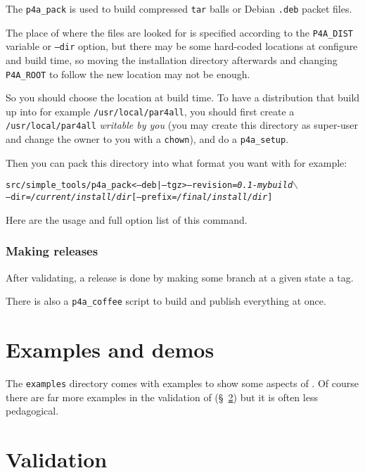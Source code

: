 \documentclass[a4paper]{article}
\begin{document}
The \verb|p4a_pack| is used to build compressed \texttt{tar} balls or Debian
\texttt{.deb} packet files.

The place of where the \Apfa files are looked for is specified according
to the \verb|P4A_DIST| variable or \texttt{--dir} option, but there may be
some hard-coded locations at configure and build time, so moving the
installation directory afterwards and changing \verb|P4A_ROOT| to follow
the new location may not be enough.

So you should choose the location at build time. To have a distribution
that build up into for example \texttt{/usr/local/par4all}, you should
first create a \texttt{/usr/local/par4all} \emph{writable by you} (you may
create this directory as super-user and change the owner to you with a
\texttt{chown}), and do a \verb|p4a_setup|.

Then you can pack this directory into what format you want with for
example:
\begin{alltt}
src/simple_tools/p4a_pack <--deb|--tgz> --revision=\emph{0.1-mybuild} \(\backslash\)
  --dir=\emph{/current/install/dir} [--prefix=\emph{/final/install/dir}]
\end{alltt}

Here are the usage and full option list of this command.




\subsubsection{Making releases}
\label{sec:releases}

After validating, a release is done by making some branch at a given state
a tag.

There is also a \verb|p4a_coffee| script to build and publish everything
at once.




\section{Examples and demos}
\label{sec:examples-demos}

The \texttt{examples} directory comes with examples to show some aspects
of \Apfa. Of course there are far more examples in the validation of \Apfa
(\S~\ref{sec:validation}) but it is often less pedagogical.


\section{Validation}
\label{sec:validation}
\end{document}
